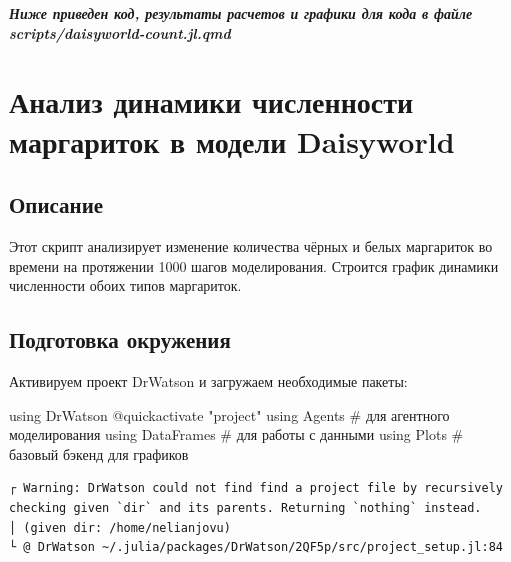 \documentclass[
  12pt,
  a4paper,
  DIV=11,
  numbers=noendperiod]{scrreprt}
\newenvironment{Shaded}{\begin{snugshade}}{\end{snugshade}}
\newcommand{\BuiltInTok}[1]{\textcolor[rgb]{0.00,0.23,0.31}{#1}}
\newcommand{\CommentTok}[1]{\textcolor[rgb]{0.37,0.37,0.37}{#1}}
\newcommand{\ImportTok}[1]{\textcolor[rgb]{0.00,0.46,0.62}{#1}}
\newcommand{\PreprocessorTok}[1]{\textcolor[rgb]{0.68,0.00,0.00}{#1}}
\newcommand{\StringTok}[1]{\textcolor[rgb]{0.13,0.47,0.30}{#1}}
\begin{document}
\textbf{\emph{Ниже приведен код, результаты расчетов и графики для кода
в файле scripts/daisyworld-count.jl.qmd}}

\chapter{Анализ динамики численности маргариток в модели
Daisyworld}\label{ux430ux43dux430ux43bux438ux437-ux434ux438ux43dux430ux43cux438ux43aux438-ux447ux438ux441ux43bux435ux43dux43dux43eux441ux442ux438-ux43cux430ux440ux433ux430ux440ux438ux442ux43eux43a-ux432-ux43cux43eux434ux435ux43bux438-daisyworld}

\section{Описание}\label{ux43eux43fux438ux441ux430ux43dux438ux435-1}

Этот скрипт анализирует изменение количества чёрных и белых маргариток
во времени на протяжении 1000 шагов моделирования. Строится график
динамики численности обоих типов маргариток.

\section{Подготовка
окружения}\label{ux43fux43eux434ux433ux43eux442ux43eux432ux43aux430-ux43eux43aux440ux443ux436ux435ux43dux438ux44f-1}

Активируем проект DrWatson и загружаем необходимые пакеты:

\begin{Shaded}
\begin{Highlighting}[]
\ImportTok{using} \BuiltInTok{DrWatson}
\PreprocessorTok{@quickactivate} \StringTok{"project"}
\ImportTok{using} \BuiltInTok{Agents}      \CommentTok{\# для агентного моделирования}
\ImportTok{using} \BuiltInTok{DataFrames}  \CommentTok{\# для работы с данными}
\ImportTok{using} \BuiltInTok{Plots}       \CommentTok{\# базовый бэкенд для графиков}
\end{Highlighting}
\end{Shaded}

\begin{verbatim}
┌ Warning: DrWatson could not find find a project file by recursively checking given `dir` and its parents. Returning `nothing` instead.
│ (given dir: /home/nelianjovu)
└ @ DrWatson ~/.julia/packages/DrWatson/2QF5p/src/project_setup.jl:84
\end{verbatim}
\end{document}
